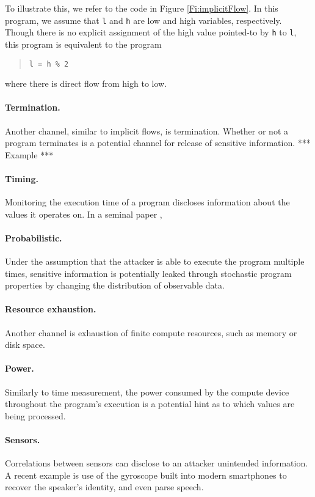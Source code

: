 To illustrate this, we refer to the code in Figure \ref{Fi:implicitFlow}. In this program, we assume that {\tt l} and {\tt h} are low and high variables, respectively. Though there is no explicit assignment of the high value pointed-to by {\tt h} to {\tt l}, this program is equivalent to the program
\begin{quote}
	{\tt l = h \% 2}
\end{quote} 
where there is direct flow from high to low.

\paragraph{Termination.} Another channel, similar to implicit flows, is termination. Whether or not a program terminates is a potential channel for release of sensitive information. *** Example ***

\paragraph{Timing.} Monitoring the execution time of a program discloses information about the values it operates on. In a seminal paper \cite{XXX},

\paragraph{Probabilistic.} Under the assumption that the attacker is able to execute the program multiple times, sensitive information is potentially leaked through stochastic program properties by changing the distribution of observable data. 

\paragraph{Resource exhaustion.} Another channel is exhaustion of finite compute resources, such as memory or disk space. 

\paragraph{Power.} Similarly to time measurement, the power consumed by the compute device throughout the program's execution is a potential hint as to which values are being processed.

\paragraph{Sensors.} Correlations between sensors can disclose to an attacker unintended information. A recent example is use of the gyroscope built into modern smartphones to recover the speaker's identity, and even parse speech.